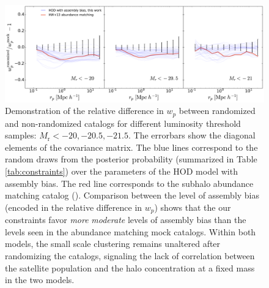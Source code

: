 \documentclass[12pt, preprint]{aastex}
\begin{document}
\begin{figure}[p]~\\
\begin{center}
\includegraphics[width=\textwidth]{paper_wprandom.pdf}
 \caption{Demonstration of the relative difference in $w_{p}$ between randomized and non-randomized catalogs for different luminosity threshold samples: $M_{\mathrm r}<-20,-20.5,-21.5$. The errorbars show the diagonal elements of the covariance matrix. The blue lines correspond to the random draws from the posterior probability (summarized in Table \ref{tab:constraints}) over the parameters of the HOD model with assembly bias. The red line corresponds to the subhalo abundance matching catalog (\citealt{hw2013,hearin2014}). Comparison between the level of assembly bias (encoded in the relative difference in $w_p$) shows that the our constraints favor \emph{more} \emph{moderate} levels of assembly bias than the levels seen in the abundance matching mock catalogs. Within both models, the small scale clustering remains unaltered after randomizing the catalogs, signaling the lack of correlation between the satellite population and the halo concentration at a fixed mass in the two models.}
\label{fig:randomized}
\end{center}
\end{figure}

\clearpage
\end{document}
